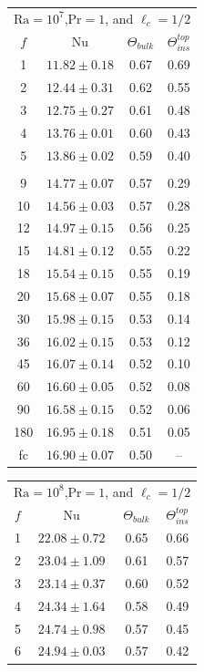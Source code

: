 \documentclass{jfm}
\begin{document}
\begin{center}
\begin{tabular}{cccc}
\toprule
\multicolumn{4}{c}{$\text{Ra}=10^7$,$\text{Pr}=1$, and $\ell_c=1/2$} \\
	$f$ & $\text{Nu}$ & $\Theta_{bulk}$ & $\Theta^{top}_{ins}$ \\
\midrule
	1 & $11.82\pm0.18$ & 0.67 & 0.69 \\
	2 & $12.44\pm0.31$ & 0.62 & 0.55 \\
	3 & $12.75\pm0.27$ & 0.61 & 0.48 \\
	4 & $13.76\pm0.01$ & 0.60 & 0.43 \\
	5 & $13.86\pm0.02$ & 0.59 & 0.40 \\\\
	9 & $14.77\pm0.07$ & 0.57 & 0.29 \\
	10 & $14.56\pm0.03$ & 0.57 & 0.28 \\
	12 & $14.97\pm0.15$ & 0.56 & 0.25 \\
	15 & $14.81\pm0.12$ & 0.55 & 0.22 \\
	18 & $15.54\pm0.15$ & 0.55 & 0.19 \\
	20 & $15.68\pm0.07$ & 0.55 & 0.18 \\
	30 & $15.98\pm0.15$ & 0.53 & 0.14 \\
	36 & $16.02\pm0.15$ & 0.53 & 0.12 \\
	45 & $16.07\pm0.14$ & 0.52 & 0.10 \\
	60 & $16.60\pm0.05$ & 0.52 & 0.08 \\
	90 & $16.58\pm0.15$ & 0.52 & 0.06 \\
	180 & $16.95\pm0.18$ & 0.51 & 0.05 \\
	fc & $16.90\pm0.07$ & 0.50 & -- \\
\bottomrule
\end{tabular}%
\begin{tabular}{cccc}
\toprule
\multicolumn{4}{c}{$\text{Ra}=10^8$,$\text{Pr}=1$, and $\ell_c=1/2$} \\
	$f$ & $\text{Nu}$ & $\Theta_{bulk}$ & $\Theta^{top}_{ins}$ \\
\midrule
	1 & $22.08\pm0.72$ & 0.65 & 0.66 \\
	2 & $23.04\pm1.09$ & 0.61 & 0.57 \\
	3 & $23.14\pm0.37$ & 0.60 & 0.52 \\
	4 & $24.34\pm1.64$ & 0.58 & 0.49 \\
	5 & $24.74\pm0.98$ & 0.57 & 0.45 \\
	6 & $24.94\pm0.03$ & 0.57 & 0.42 \\

\end{tabular}
\end{center}
\end{document}
